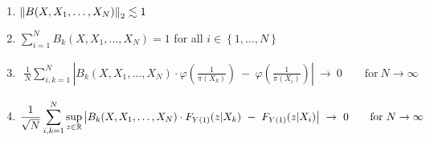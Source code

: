 \begin{lemma}
  \begin{enumerate}[label=(\roman*)]
    \item
      $\left\lVert B(X,X_1,\ldots,X_N)\right\rVert_2\lesssim 1$ 
      \item
      $
      \sum_{i=1}^{N}
        B_k(X,X_1,\ldots,X_N)
        =1
      $
      for all $i\in \left\{
        1,\ldots,N
      \right\}$
      \item
      \begin{align*}
        \frac
        {1}
        {N}
        \sum_{i,k=1}^{N}
            \left|
        B_k(X,X_1,\ldots,X_N)
        \cdot
            \varphi
            \left(
              \frac
              {1}
              {\pi(X_k)}
            \right)
            \ 
            -
            \ 
            \varphi
            \left(
              \frac
              {1}
              {\pi(X_i)}
            \right)
            \right|
            \ 
            \to
            \ 
            0
            \qquad
            \text{for}
            \ 
            N\to\infty
          \end{align*}
\item
      \begin{align*}
        \frac
        {1}
        {\sqrt{N}}
        \sum_{i,k=1}^{N}
        \sup_{z\in\R}
            \left|
        B_k(X,X_1,\ldots,X_N)
        \cdot
        F_{Y(1)}(z|X_k)
            \ 
            -
            \ 
        F_{Y(1)}(z|X_i)
            \right|
            \ 
            \to
            \ 
            0
            \qquad
            \text{for}
            \ 
            N\to\infty
      \end{align*}
\end{enumerate}
\end{lemma}

